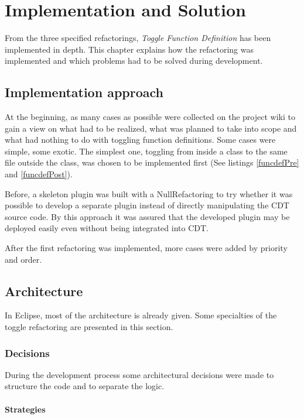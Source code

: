 \chapter{Implementation and Solution}
\thispagestyle{fancy}

From the three specified refactorings, \textit{Toggle Function Definition} has 
been implemented in depth. This chapter explains how the refactoring was 
implemented and which problems had to be solved during development.

\section{Implementation approach}

At the beginning, as many cases as possible were collected on the project wiki 
to gain a view on what had to be realized, what was planned to take into scope 
and what had nothing to do with toggling function definitions. Some cases were 
simple, some exotic. The simplest one, toggling from inside a class to the same 
file outside the class, was chosen to be implemented first (See listings 
\ref{funcdefPre} and \ref{funcdefPost}). 

Before, a skeleton plugin was built with a NullRefactoring to try whether it was
possible to develop a separate plugin instead of directly manipulating the CDT
source code. By this approach it was assured that the developed plugin may be
deployed easily even without being integrated into CDT.

After the first refactoring was implemented, more cases were added by priority
and order.

\section{Architecture}

In Eclipse, most of the architecture is already given. Some specialties of the 
toggle refactoring are presented in this section.

\subsection{Decisions}

During the development process some architectural decisions were made to
structure the code and to separate the logic.

\subsubsection{Strategies}

